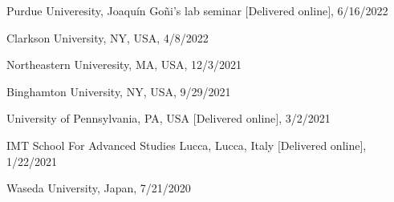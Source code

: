 \documentclass[11pt,letter]{article}
\renewenvironment{itemize}{
  \begin{list}{}{
    \setlength{\leftmargin}{1.5em}
    \setlength{\itemsep}{0.25em}
    \setlength{\parskip}{0pt}
    \setlength{\parsep}{0.25em}
  }
}{
  \end{list}
}
\begin{document}
\begin{itemize}
\item
Purdue Univeresity, Joaqu\'{i}n Go\~{n}i's lab seminar $[$Delivered online$]$, 6/16/2022

\item
Clarkson University, NY, USA, 4/8/2022


\item
Northeastern Univeresity, MA, USA, 12/3/2021

\item
Binghamton University, NY, USA, 9/29/2021
%

\item
University of Pennsylvania, PA, USA $[$Delivered online$]$, 3/2/2021


\item
IMT School For Advanced Studies Lucca, Lucca, Italy $[$Delivered online$]$, 1/22/2021




\item
Waseda University, Japan, 7/21/2020


\end{itemize}
\end{document}

